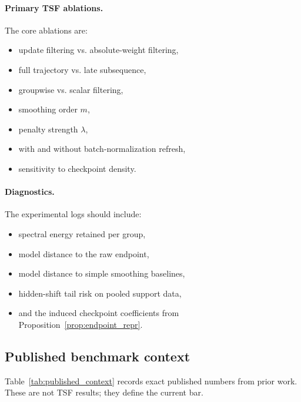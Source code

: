 \documentclass{article}
\newcommand{\tsf}{\textup{\textsc{TSF}}}
\begin{document}
\paragraph{Primary \tsf{} ablations.}
The core ablations are:
\begin{itemize}[leftmargin=1.4em]
    \item update filtering vs. absolute-weight filtering,
    \item full trajectory vs. late subsequence,
    \item groupwise vs. scalar filtering,
    \item smoothing order \(m\),
    \item penalty strength \(\lambda\),
    \item with and without batch-normalization refresh,
    \item sensitivity to checkpoint density.
\end{itemize}

\paragraph{Diagnostics.}
The experimental logs should include:
\begin{itemize}[leftmargin=1.4em]
    \item spectral energy retained per group,
    \item model distance to the raw endpoint,
    \item model distance to simple smoothing baselines,
    \item hidden-shift tail risk on pooled support data,
    \item and the induced checkpoint coefficients from Proposition~\ref{prop:endpoint_repr}.
\end{itemize}

\subsection{Published benchmark context}

Table~\ref{tab:published_context} records exact published numbers from prior work. These are not \tsf{} results; they define the current bar.
\end{document}
